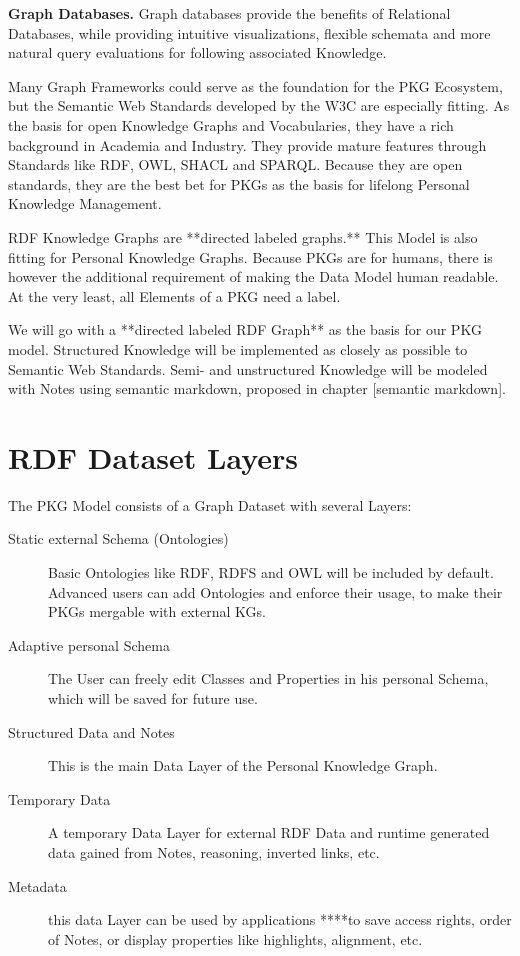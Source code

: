 \textbf{Graph Databases.} Graph databases provide the benefits of Relational Databases, while providing intuitive visualizations, flexible schemata and more natural query evaluations for following associated Knowledge.

Many Graph Frameworks could serve as the foundation for the PKG Ecosystem, but the Semantic Web Standards developed by the W3C are especially fitting. As the basis for open Knowledge Graphs and Vocabularies, they have a rich background in Academia and Industry. They provide mature features through Standards like RDF, OWL, SHACL and SPARQL.
Because they are open standards, they are the best bet for PKGs as the basis for lifelong Personal Knowledge Management. 

RDF Knowledge Graphs are **directed labeled graphs.** This Model is also fitting for Personal Knowledge Graphs. Because PKGs are for humans, there is however the additional requirement of making the Data Model human readable. At the very least, all Elements of a PKG need a label.

We will go with a **directed labeled RDF Graph** as the basis for our PKG model. Structured Knowledge will be implemented as closely as possible to Semantic Web Standards. Semi- and unstructured Knowledge will be modeled with Notes using semantic markdown, proposed in chapter [semantic markdown].

\section{RDF Dataset Layers}

The PKG Model consists of a Graph Dataset with several Layers:
\begin{description}
\item[Static external Schema (Ontologies)]Basic Ontologies like RDF, RDFS and OWL will be included by default. Advanced users can add Ontologies and enforce their usage, to make their PKGs mergable with external KGs.

\item[Adaptive personal Schema]The User can freely edit Classes and Properties in his personal Schema, which will be saved for future use.

\item[Structured Data and Notes]This is the main Data Layer of the Personal Knowledge Graph.

\item[Temporary Data]A temporary Data Layer for external RDF Data and runtime generated data gained from Notes, reasoning, inverted links, etc.

\item[Metadata]this data Layer can be used by applications ****to save access rights, order of Notes, or display properties like highlights, alignment, etc.
\end{description}


